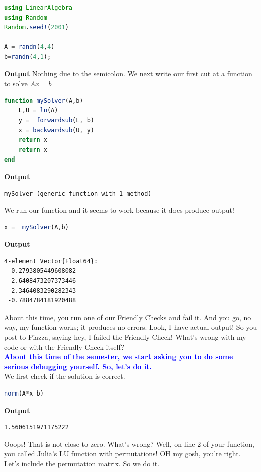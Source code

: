 \begin{lstlisting}[language=Julia,style=mystyle]
using LinearAlgebra
using Random
Random.seed!(2001)

A = randn(4,4)
b=randn(4,1);
\end{lstlisting}
\textbf{Output} 
Nothing due to the semicolon. We next write our first cut at a function to solve $Ax=b$



\begin{lstlisting}[language=Julia,style=mystyle]
function mySolver(A,b)
    L,U = lu(A)
    y =  forwardsub(L, b)
    x = backwardsub(U, y)
    return x
    return x
end      
\end{lstlisting}
\textbf{Output} 
\begin{verbatim}
mySolver (generic function with 1 method)
\end{verbatim}

We run our function and it seems to work because it does produce output!

\begin{lstlisting}[language=Julia,style=mystyle]
x =  mySolver(A,b)
\end{lstlisting}
\textbf{Output} 
\begin{verbatim}
4-element Vector{Float64}:
  0.2793805449608082
  2.6408473207373446
 -2.3464083290282343
 -0.7884784181920488
\end{verbatim}

About this time, you run one of our Friendly Checks and fail it. And you go, no way, my function works; it produces no errors. Look, I have actual output! So you post to Piazza, saying hey, I failed the Friendly Check! What's wrong with my code or with the Friendly Check itself? \\

\textcolor{blue}{\bf \large About this time of the semester, we start asking you to do some serious debugging yourself. So, let's do it.} \\

We first check if the solution is correct.

\begin{lstlisting}[language=Julia,style=mystyle]
norm(A*x-b)
\end{lstlisting}
\textbf{Output} 
\begin{verbatim}
1.5606151971175222
\end{verbatim}

Ooops! That is not close to zero. What's wrong? Well, on line 2 of your function, you called Julia's LU function with permutations! OH my gosh, you're right. Let's include the permutation matrix. So we do it.

